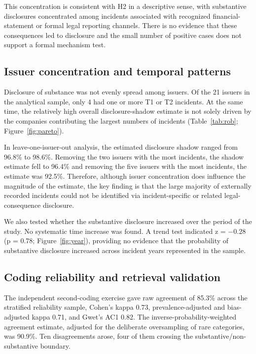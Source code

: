 \documentclass[utf8]{FrontiersinHarvard}
\begin{document}
This concentration is consistent with H2 in a descriptive sense, with substantive disclosures concentrated among incidents associated with recognized financial-statement or formal legal reporting channels. There is no evidence that these consequences led to disclosure and the small number of positive cases does not support a formal mechanism test.

\subsection{Issuer concentration and temporal patterns}
Disclosure of substance was not evenly spread among issuers. Of the 21 issuers in the analytical sample, only 4 had one or more T1 or T2 incidents. At the same time, the relatively high overall disclosure-shadow estimate is not solely driven by the companies contributing the largest numbers of incidents (Table~\ref{tab:rob}; Figure~\ref{fig:pareto}).

In leave-one-issuer-out analysis, the estimated disclosure shadow ranged from 96.8\% to 98.6\%. Removing the two issuers with the most incidents, the shadow estimate fell to 96.4\% and removing the five issuers with the most incidents, the estimate was 92.5\%. Therefore, although issuer concentration does influence the magnitude of the estimate, the key finding is that the large majority of externally recorded incidents could not be identified via incident-specific or related legal-consequence disclosure.

We also tested whether the substantive disclosure increased over the period of the study. No systematic time increase was found. A trend test indicated z = $-0.28$ (p = 0.78; Figure~\ref{fig:year}), providing no evidence that the probability of substantive disclosure increased across incident years represented in the sample.

\subsection{Coding reliability and retrieval validation}\label{sec:reliability}
The independent second-coding exercise gave raw agreement of 85.3\% across the stratified reliability sample, Cohen's kappa 0.73, prevalence-adjusted and bias-adjusted kappa 0.71, and Gwet's AC1 0.82. The inverse-probability-weighted agreement estimate, adjusted for the deliberate oversampling of rare categories, was 90.9\%. Ten disagreements arose, four of them crossing the substantive/non-substantive boundary.
\end{document}
